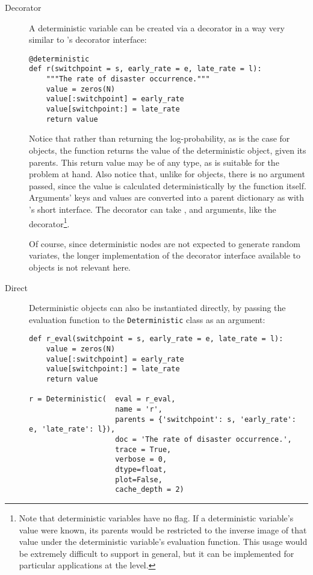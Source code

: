 \begin{description}
    \item[Decorator] A deterministic variable can be created via a decorator in a way very similar to 's decorator interface:
\begin{verbatim}
@deterministic
def r(switchpoint = s, early_rate = e, late_rate = l):
    """The rate of disaster occurrence."""
    value = zeros(N)
    value[:switchpoint] = early_rate
    value[switchpoint:] = late_rate
    return value
\end{verbatim}
Notice that rather than returning the log-probability, as is the case for  objects, the function returns the value of the deterministic object, given its parents. This return value may be of any type, as is suitable for the problem at hand. Also notice that, unlike for  objects, there is no  argument passed, since the value is calculated deterministically by the function itself. Arguments' keys and values are converted into a parent dictionary as with 's short interface. The  decorator can take ,  and  arguments, like the  decorator\footnote{Note that deterministic variables have no  flag. If a deterministic variable's value were known, its parents would be restricted to the inverse image of that value under the deterministic variable's evaluation function. This usage would be extremely difficult to support in general, but it can be implemented for particular applications at the  level.}.

Of course, since deterministic nodes are not expected to generate random variates, the longer implementation of the decorator interface available to  objects is not relevant here.

    \item[Direct] Deterministic objects can also be instantiated directly, by passing the evaluation function to the \texttt{Deterministic} class as an argument:
\begin{verbatim}
def r_eval(switchpoint = s, early_rate = e, late_rate = l):
    value = zeros(N)
    value[:switchpoint] = early_rate
    value[switchpoint:] = late_rate
    return value

r = Deterministic(  eval = r_eval, 
                    name = 'r',
                    parents = {'switchpoint': s, 'early_rate': e, 'late_rate': l}),
                    doc = 'The rate of disaster occurrence.',
                    trace = True,
                    verbose = 0,
                    dtype=float,
                    plot=False,
                    cache_depth = 2)
\end{verbatim}
\end{description}

